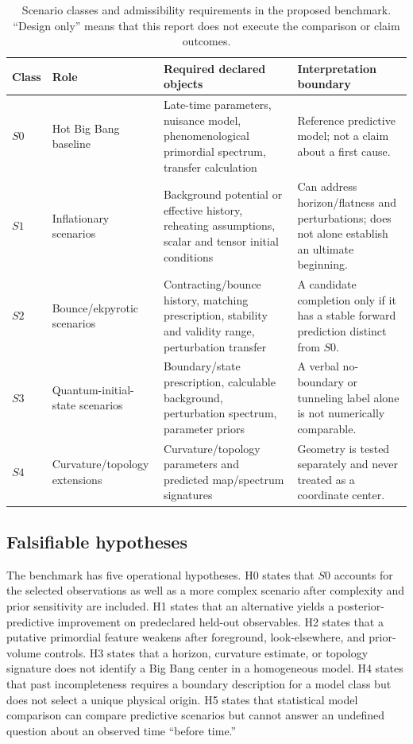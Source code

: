 \documentclass[10pt,conference]{IEEEtran}
\begin{document}
\begin{table}[!t]
\caption{Scenario classes and admissibility requirements in the proposed benchmark. ``Design only'' means that this report does not execute the comparison or claim outcomes.}
\label{tab:scenario-ledger}
\centering
\footnotesize
\begin{tabular}{p{}p{}p{}p{}}
\toprule
Class & Role & Required declared objects & Interpretation boundary \\
\midrule
$S0$ & Hot Big Bang baseline & Late-time parameters, nuisance model, phenomenological primordial spectrum, transfer calculation & Reference predictive model; not a claim about a first cause. \\
$S1$ & Inflationary scenarios & Background potential or effective history, reheating assumptions, scalar and tensor initial conditions & Can address horizon/flatness and perturbations; does not alone establish an ultimate beginning. \\
$S2$ & Bounce/ekpyrotic scenarios & Contracting/bounce history, matching prescription, stability and validity range, perturbation transfer & A candidate completion only if it has a stable forward prediction distinct from $S0$. \\
$S3$ & Quantum-initial-state scenarios & Boundary/state prescription, calculable background, perturbation spectrum, parameter priors & A verbal no-boundary or tunneling label alone is not numerically comparable. \\
$S4$ & Curvature/topology extensions & Curvature/topology parameters and predicted map/spectrum signatures & Geometry is tested separately and never treated as a coordinate center. \\
\bottomrule
\end{tabular}
\end{table}

\subsection{Falsifiable hypotheses}

The benchmark has five operational hypotheses. H0 states that $S0$ accounts for the selected observations as well as a more complex scenario after complexity and prior sensitivity are included. H1 states that an alternative yields a posterior-predictive improvement on predeclared held-out observables. H2 states that a putative primordial feature weakens after foreground, look-elsewhere, and prior-volume controls. H3 states that a horizon, curvature estimate, or topology signature does not identify a Big Bang center in a homogeneous model. H4 states that past incompleteness requires a boundary description for a model class but does not select a unique physical origin. H5 states that statistical model comparison can compare predictive scenarios but cannot answer an undefined question about an observed time ``before time.''
\end{document}
